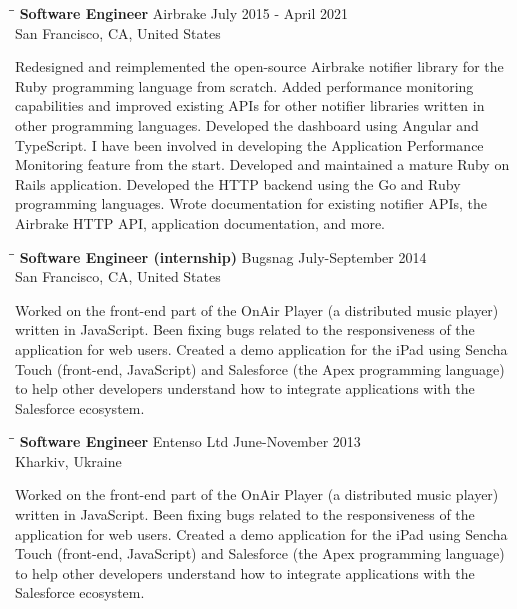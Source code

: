 \documentclass{res}
\begin{document}
\begin{resume}
  \begin{tabbing}
    \hspace{2.3in}\= \hspace{2.6in}\= \kill
    {\bf Software Engineer}  \>Airbrake \> \hspace{-0.3in} July 2015 - April 2021\\
    \>San Francisco, CA, United States
  \end{tabbing}\vspace{-20pt}
  Redesigned and reimplemented the open-source Airbrake notifier library for the
  Ruby programming language from scratch. Added performance monitoring
  capabilities and improved existing APIs for other notifier libraries written
  in other programming languages. Developed the dashboard using Angular and
  TypeScript. I have been involved in developing the Application Performance
  Monitoring feature from the start. Developed and maintained a mature Ruby on
  Rails application. Developed the HTTP backend using the Go and Ruby
  programming languages. Wrote documentation for existing notifier APIs, the
  Airbrake HTTP API, application documentation, and more.


  \begin{tabbing}
    \hspace{2.3in}\= \hspace{2.6in}\= \kill
    {\bf Software Engineer (internship)}  \>Bugsnag \> \hspace{-0.2in} July-September  2014\\
    \>San Francisco, CA, United States
  \end{tabbing}\vspace{-20pt}
  Worked on the front-end part of the OnAir Player (a distributed music player)
  written in JavaScript. Been fixing bugs related to the responsiveness of the
  application for web users. Created a demo application for the iPad using
  Sencha Touch (front-end, JavaScript) and Salesforce (the Apex programming
  language) to help other developers understand how to integrate applications
  with the Salesforce ecosystem.

  \begin{tabbing}
    \hspace{2.3in}\= \hspace{2.6in}\= \kill
    {\bf Software Engineer}  \>Entenso Ltd \> \hspace{-0.2in} June-November 2013\\
    \>Kharkiv, Ukraine
  \end{tabbing}\vspace{-20pt}
  Worked on the front-end part of the OnAir Player (a distributed music player)
  written in JavaScript. Been fixing bugs related to the responsiveness of the
  application for web users. Created a demo application for the iPad using
  Sencha Touch (front-end, JavaScript) and Salesforce (the Apex programming
  language) to help other developers understand how to integrate applications
  with the Salesforce ecosystem.


\end{resume}
\end{document}
